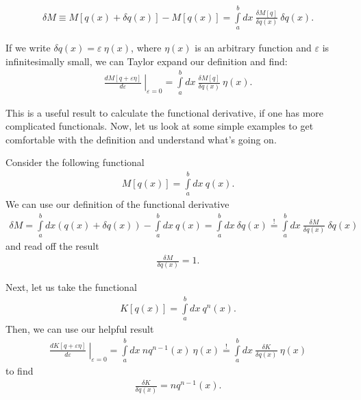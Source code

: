 \begin{definition}
\begin{align}
\delta M \equiv M[q(x) + \delta q(x)] - M[q(x)] = \displaystyle\int\limits_{a}^{b} dx \ \frac{\delta M[q]}{\delta q(x)} \ \delta q(x).
\end{align}
\end{definition}

\pagebreak

If we write $\delta q(x) = \varepsilon \ \eta(x)$, where $\eta(x)$ is an arbitrary function and $\varepsilon$ is infinitesimally small, we can Taylor expand our definition and find:
\begin{align}
\left. \frac{d M[q + \varepsilon \eta]}{d\varepsilon} \ \right|_{\varepsilon=0} = \displaystyle\int\limits_{a}^{b} dx \ \frac{\delta M[q]}{\delta q(x)} \ \eta(x).
\end{align}

This is a useful result to calculate the functional derivative, if one has more complicated functionals. Now, let us look at some simple examples to get comfortable with the definition and understand what's going on.
\vspace{15pt}
\begin{example}
Consider the following functional
\begin{align}
M[q(x)] =  \displaystyle\int\limits_{a}^{b} dx \ q(x).
\end{align}
We can use our definition of the functional derivative
\begin{align}
\delta M = \displaystyle\int\limits_{a}^{b} dx \left( q(x) + \delta q(x) \right) - \displaystyle\int\limits_{a}^{b} dx \ q(x) = \displaystyle\int\limits_{a}^{b} dx \ \delta q(x) \overset{!}{=} \displaystyle\int\limits_{a}^{b} dx \ \frac{\delta M}{\delta q(x)} \ \delta q(x)
\end{align}
and read off the result
\begin{align}
\frac{\delta M}{\delta q(x)} = 1.
\end{align}
\end{example}
\vspace{20pt}
\begin{example}
Next, let us take the functional
\begin{align}
K[q(x)] =  \displaystyle\int\limits_{a}^{b} dx \ q^n(x).
\end{align}
Then, we can use our helpful result
\begin{align}
\left. \frac{d K[q + \varepsilon \eta]}{d\varepsilon} \ \right|_{\varepsilon=0} = \displaystyle\int\limits_{a}^{b} dx \ n q^{n-1}(x) \ \eta(x) \overset{!}{=} \displaystyle\int\limits_{a}^{b} dx \ \frac{\delta K}{\delta q(x)} \ \eta(x) 
\end{align}
to find
\begin{align}
\frac{\delta K}{\delta q(x)} = n q^{n-1}(x).
\end{align}
\end{example}
\vspace{15pt}


